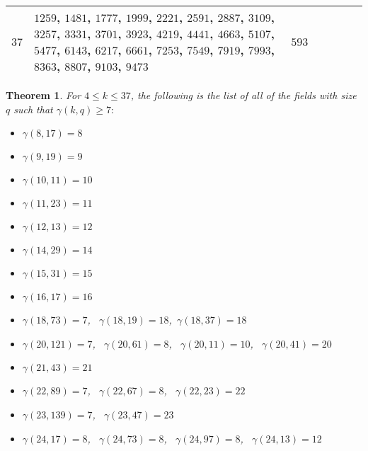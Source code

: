 \documentclass[11pt,reqno]{amsart}
\newtheorem{thm}{Theorem}[section]
\begin{document}
\begin{longtable}{ | p{0.5cm} | p{9cm} | p{2.5cm} | p{2.1cm} | p{2.1cm} | }
\hline
$37$ & $1259$, $1481$, $1777$, $1999$, $2221$, $2591$, $2887$, $3109$, $3257$, $3331$, $3701$, $3923$, $4219$, $4441$, $4663$, $5107$, $5477$, $6143$, $6217$, $6661$, $7253$, $7549$, $7919$, $7993$, $8363$, $8807$, $9103$, $9473$ & $593$ & \ \ & \ \  \\
\hline
\end{longtable}

\begin{thm} \label{gamma bigger than or equal to 7-thm}
For $4 \leqslant k \leqslant 37$, the following is the list of all of the fields with size $q$ such that $ \gamma (k,q) \geqslant 7:$
\begin{itemize}
	\item $\gamma(8,17)=8$ \vspace{-0.3cm}
	\item $\gamma(9,19)=9$ \vspace{-0.3cm}
	\item $ \gamma(10,11)=10$ \vspace{-0.3cm}
	\item $\gamma(11,23)=11$ \vspace{-0.3cm}
	\item $\gamma(12,13)=12$ \vspace{-0.3cm}
	\item $ \gamma(14,29)=14 $ \vspace{-0.3cm}
	\item $ \gamma(15,31)=15 $ \vspace{-0.3cm}
	\item $ \gamma(16,17)=16 $ \vspace{-0.3cm}
	\item $ \gamma(18,73)=7$, \  $ \gamma(18,19)=18$,\  $ \gamma(18,37)=18 $ \vspace{-0.3cm}
	\item $ \gamma(20,121)=7 $, \ $ \gamma(20,61)=8 $, \ $ \gamma(20,11)=10 $, \ $ \gamma(20,41)=20 $ \vspace{-0.3cm}
	\item $ \gamma(21,43)=21 $ \vspace{-0.3cm}
	\item $ \gamma(22,89)=7 $, \ $ \gamma(22,67)=8 $, \ $ \gamma(22,23)=22 $ \vspace{-0.3cm}
	\item $ \gamma(23,139)=7 $, \ $ \gamma(23,47)=23 $ \vspace{-0.3cm}
	\item $ \gamma(24,17)=8 $, \ $ \gamma(24,73)=8 $, \ $ \gamma(24,97)=8 $, \ $ \gamma(24,13)=12 $ \vspace{-0.3cm}

\end{itemize}
\end{thm}
\end{document}

